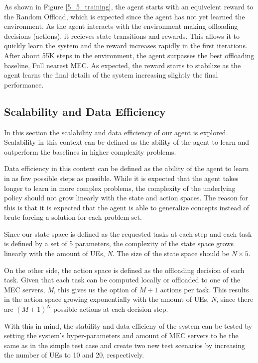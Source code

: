 \documentclass[conference]{IEEEtran}
\begin{document}
As shown in Figure \ref{5_5_training}, the agent starts with an equivelent reward to the Random Offload, which is expected since the agent has not yet learned the environment. As the agent interacts with the environment making offloading decisions (actions), it recieves state transitions and rewards. This allows it to quickly learn the system and the reward increases rapidly in the first iterations. After about 55K steps in the environment, the agent surpasses the best offloading baseline, Full nearest MEC. As expected, the reward starts to stabilize as the agent learns the final details of the system increasing slightly the final performance.

\subsection{Scalability and Data Efficiency} \label{scalability_data}

In this section the scalability and data efficiency of our agent is explored. Scalability in this context can be defined as the ability of the agent to learn and outperform the baselines in higher complexity problems. 

Data efficiency in this context can be defined as the ability of the agent to learn in as few possible steps as possible. While it is expected that the agent takes longer to learn in more complex problems, the complexity of the underlying policy should not grow linearly with the state and action spaces. The reason for this is that it is expected that the agent is able to generalize concepts instead of brute forcing a solution for each problem set.

Since our state space is defined as the requested tasks at each step and each task is defined by a set of 5 parameters, the complexity of the state space grows linearly with the amount of \acrshort{UE}s, \emph{N}. The size of the state space should be $N \times 5$. 

On the other side, the action space is defined as the offloading decision of each task. Given that each task can be computed locally or offloaded to one of the \acrshort{MEC} servers, \emph{M}, this gives us the option of $M + 1$ actions per task. This results in the action space growing exponentially with the amount of \acrshort{UE}s, \emph{N}, since there are $(M + 1)^N$ possible actions at each decision step.

With this in mind, the stability and data efficieny of the system can be tested by setting the system's hyper-parameters and amount of \acrshort{MEC} servers to be the same as in the simple test case and create two new test scenarios by increasing the number of \acrshort{UE}s to 10 and 20, respectively.
\end{document}
